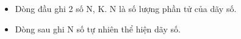 \begin{itemize}
	\item     Dòng đầu ghi 2 số N, K. N là số lượng phần tử của dãy số.   
	\item     Dòng sau ghi N số tự nhiên thể hiện dãy số.   
\end{itemize}